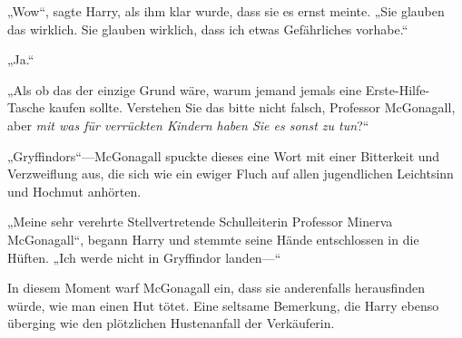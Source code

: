 „Wow“, sagte Harry, als ihm klar wurde, dass sie es ernst meinte. „Sie glauben das wirklich. Sie glauben wirklich, dass ich etwas Gefährliches vorhabe.“

„Ja.“

„Als ob das der einzige Grund wäre, warum jemand jemals eine Erste-Hilfe-Tasche kaufen sollte. Verstehen Sie das bitte nicht falsch, Professor McGonagall, aber \emph{mit was für verrückten Kindern haben Sie es sonst zu tun}?“

„Gryffindors“—McGonagall spuckte dieses eine Wort mit einer Bitterkeit und Verzweiflung aus, die sich wie ein ewiger Fluch auf allen jugendlichen Leichtsinn und Hochmut anhörten.

„Meine sehr verehrte Stellvertretende Schulleiterin Professor Minerva McGonagall“, begann Harry und stemmte seine Hände entschlossen in die Hüften. „Ich werde nicht in Gryffindor landen—“

In diesem Moment warf McGonagall ein, dass sie anderenfalls herausfinden würde, wie man einen Hut tötet. Eine seltsame Bemerkung, die Harry ebenso überging wie den plötzlichen Hustenanfall der Verkäuferin.

